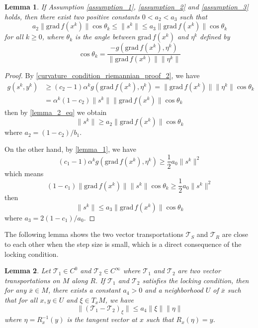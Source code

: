 \documentclass[12pt,a4paper,draft]{article}  %
\newtheorem{lemma}{Lemma}[section]
\theoremstyle{definition}
\numberwithin{equation}{section}
\newcommand{\grad}{\mathrm{grad}\,}
\newcommand{\VT}{\mathcal{T}}
\begin{document}
\begin{lemma}\label{lemma_3}
        If Assumption \ref{assumption_1}, \ref{assumption_2} and \ref{assumption_3} holds, then there exist two positive constants $0<a_2<a_3$ such that
        \begin{equation}\label{lemma_3_eq}
                a_2\|\grad f(x^k)\|\cos\theta_k \leq \|s^k\| \leq a_3\|\grad f(x^k)\|\cos\theta_k
        \end{equation}
        for all $k\geq 0$, where $\theta_k$ is the angle between $\grad f(x^k)$ and $\eta^k$ defined by
        \[
        \cos\theta_k = \frac{-g(\grad f(x^k), \eta^k)}{\|\grad f(x^k)\|\|\eta^k\|}
        \]
\end{lemma}
\begin{proof}
        By \eqref{curvature_condition_riemannian_proof_2}, we have
        \[
        \begin{aligned}
                g(s^k,y^k) &\geq (c_2-1)\alpha^k g(\grad f(x^k), \eta^k) = \|\grad f(x^k)\|\|\eta^k\|\cos\theta_k\\
        &= \alpha^k(1-c_2)\|s^k\|\|\grad f(x^k)\|\cos\theta_k
        \end{aligned}
        \]
        then by \eqref{lemma_2_eq} we obtain
        \[
        \|s^k\|\geq a_2\|\grad f(x^k)\|\cos\theta_k
        \]
        where $a_2 = (1-c_2)/b_1$. 

        On the other hand, by \eqref{lemma_1}, we have
        \[
        (c_1-1)\alpha^k g(\grad f(x^k), \eta^k) \geq \frac{1}{2}a_0\|s^k\|^2 
        \]
        which means
        \[
        (1-c_1)\|\grad f(x^k)\|\|s^k\|\cos\theta_k \geq \frac{1}{2}a_0\|s^k\|^2
        \]
        then
        \[
        \|s^k\| \leq a_3\|\grad f(x^k)\|\cos\theta_k
        \]
        where $a_3 = 2(1-c_1)/a_0$.
\end{proof}
The following lemma shows the two vector transportations $\VT_S$ and $\VT_R$ are close to each other when the step size is small, which is a direct consequence of the locking condition.
\begin{lemma}
        Let $\VT_1\in C^0$ and $\VT_2\in C^\infty$ where $\VT_1$ and $\VT_2$ are two vector transportations on $M$ along $R$. If $\VT_1$ and $\VT_2$ satisfies the locking condition, then for any $\overline{x}\in M$, there exists a constant $a_4>0$ and a neighborhood $U$ of $\overline{x}$ such that for all $x,y\in U$ and $\xi\in T_x M$, we have
        \begin{equation*}
                \|(\VT_1 - \VT_2)_\xi\| \leq a_4\|\xi\|\|\eta\|
        \end{equation*}
        where $\eta = R_x^{-1}(y)$ is the tangent vector at $x$ such that $R_x(\eta) = y$.
\end{lemma}
\end{document}
